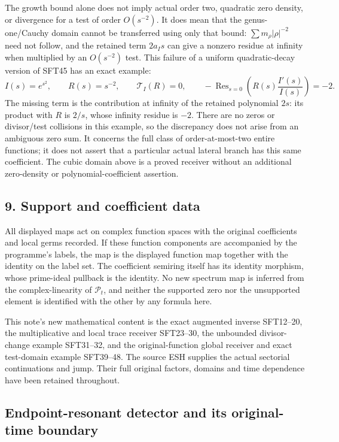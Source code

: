 \documentclass[
  10pt,
  a4paper,
]{article}
\begin{document}
The growth bound alone does not imply actual order two, quadratic zero
density, or divergence for a test of order \(O(s^{-2})\). It does mean
that the genus-one/Cauchy domain cannot be transferred using only that
bound: \(\sum m_\rho|\rho|^{-2}\) need not follow, and the retained term
\(2a_Is\) can give a nonzero residue at infinity when multiplied by an
\(O(s^{-2})\) test. This failure of a uniform quadratic-decay version of
SFT45 has an exact example: \[
 I(s)=e^{s^2},\qquad R(s)=s^{-2},\qquad
 \mathscr T_I(R)=0,\qquad
 -\operatorname{Res}_{s=0}
       \left(R(s)\frac{I'(s)}{I(s)}\right)=-2.
 \tag{SFT48}
\] The missing term is the contribution at infinity of the retained
polynomial \(2s\): its product with \(R\) is \(2/s\), whose infinity
residue is \(-2\). There are no zeros or divisor/test collisions in this
example, so the discrepancy does not arise from an ambiguous zero sum.
It concerns the full class of order-at-most-two entire functions; it
does not assert that a particular actual lateral branch has this same
coefficient. The cubic domain above is a proved receiver without an
additional zero-density or polynomial-coefficient assertion.

\subsection{9. Support and coefficient
data}\label{support-and-coefficient-data}

All displayed maps act on complex function spaces with the original
coefficients and local germs recorded. If these function components are
accompanied by the programme's labels, the map is the displayed function
map together with the identity on the label set. The coefficient
semiring itself has its identity morphism, whose prime-ideal pullback is
the identity. No new spectrum map is inferred from the complex-linearity
of \(\mathcal P_t\), and neither the supported zero nor the unsupported
element is identified with the other by any formula here.

This note's new mathematical content is the exact augmented inverse
SFT12--20, the multiplicative and local trace receiver SFT23--30, the
unbounded divisor-change example SFT31--32, and the original-function
global receiver and exact test-domain example SFT39--48. The source ESH
supplies the actual sectorial continuations and jump. Their full
original factors, domains and time dependence have been retained
throughout.

\subsection{Endpoint-resonant detector and its original-time
boundary}\label{endpoint-resonant-detector-and-its-original-time-boundary}
\end{document}
